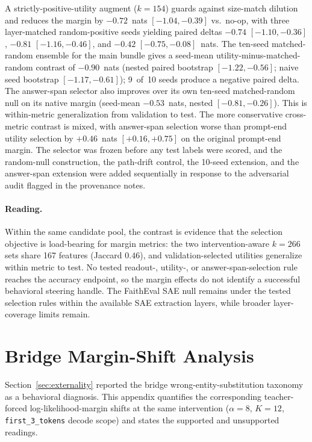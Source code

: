 \documentclass{article}
\begin{document}
A strictly-positive-utility augment ($k = 154$) guards against size-match dilution and reduces the margin by $-0.72$~nats $[-1.04, -0.39]$ vs.\ no-op, with three layer-matched random-positive seeds yielding paired deltas $-0.74$ $[-1.10, -0.36]$, $-0.81$ $[-1.16, -0.46]$, and $-0.42$ $[-0.75, -0.08]$~nats.
The ten-seed matched-random ensemble for the main bundle gives a seed-mean utility-minus-matched-random contrast of $-0.90$~nats (nested paired bootstrap $[-1.22, -0.56]$; naive seed bootstrap $[-1.17, -0.61]$); 9~of~10 seeds produce a negative paired delta.
The answer-span selector also improves over its own ten-seed matched-random null on its native margin (seed-mean $-0.53$~nats, nested $[-0.81, -0.26]$).
This is within-metric generalization from validation to test.
The more conservative cross-metric contrast is mixed, with answer-span selection worse than prompt-end utility selection by $+0.46$~nats $[+0.16, +0.75]$ on the original prompt-end margin.
The selector was frozen before any test labels were scored, and the random-null construction, the path-drift control, the 10-seed extension, and the answer-span extension were added sequentially in response to the adversarial audit flagged in the provenance notes.

\paragraph{Reading.}
Within the same candidate pool, the contrast is evidence that the selection objective is load-bearing for margin metrics: the two intervention-aware $k=266$ sets share 167 features (Jaccard $0.46$), and validation-selected utilities generalize within metric to test.
No tested readout-, utility-, or answer-span-selection rule reaches the accuracy endpoint, so the margin effects do not identify a successful behavioral steering handle.
The FaithEval SAE null remains under the tested selection rules within the available SAE extraction layers, while broader layer-coverage limits remain.
\FloatBarrier

\section{Bridge Margin-Shift Analysis}
\label{app:bridge_margin}

Section~\ref{sec:externality} reported the bridge wrong-entity-substitution taxonomy as a behavioral diagnosis.
This appendix quantifies the corresponding teacher-forced log-likelihood-margin shifts at the same intervention ($\alpha = 8$, $K = 12$, \texttt{first\_3\_tokens} decode scope) and states the supported and unsupported readings.
\end{document}
